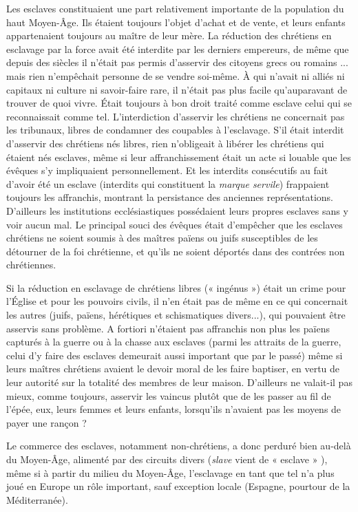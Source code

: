  Les esclaves constituaient une part relativement importante de la population du haut Moyen-Âge. Ils étaient toujours l'objet d'achat et de vente, et leurs enfants appartenaient toujours au maître de leur mère. La réduction des chrétiens en esclavage par la force avait été interdite par les derniers empereurs, de même que depuis des siècles il n'était pas permis d'asservir des citoyens grecs ou romains ... mais rien n'empêchait personne de se vendre soi-même. À qui n'avait ni alliés ni capitaux ni culture ni savoir-faire rare, il n'était pas plus facile qu'auparavant de trouver de quoi vivre. Était toujours à bon droit traité comme esclave celui qui se reconnaissait comme tel. L'interdiction d'asservir les chrétiens ne concernait pas les tribunaux, libres de condamner des coupables à l'esclavage. S'il était interdit d'asservir des chrétiens nés libres, rien n'obligeait à libérer les chrétiens qui étaient nés esclaves, même si leur affranchissement était un acte si louable que les évêques s'y impliquaient personnellement. Et les interdits consécutifs au fait d'avoir été un esclave (interdits qui constituent la \emph{marque servile}) frappaient toujours les affranchis, montrant la persistance des anciennes représentations. D'ailleurs les institutions ecclésiastiques possédaient leurs propres esclaves sans y voir aucun mal. Le principal souci des évêques était d'empêcher que les esclaves chrétiens ne soient soumis à des maîtres païens ou juifs susceptibles de les détourner de la foi chrétienne, et qu'ils ne soient déportés dans des contrées non chrétiennes. 

 Si la réduction en esclavage de chrétiens libres (« ingénus ») était un crime pour l'Église et pour les pouvoirs civils, il n'en était pas de même en ce qui concernait les autres (juifs, païens, hérétiques et schismatiques divers...), qui pouvaient être asservis sans problème. A fortiori n'étaient pas affranchis non plus les païens capturés à la guerre ou à la chasse aux esclaves (parmi les attraits de la guerre, celui d'y faire des esclaves demeurait aussi important que par le passé) même si leurs maîtres chrétiens avaient le devoir moral de les faire baptiser, en vertu de leur autorité sur la totalité des membres de leur maison. D'ailleurs ne valait-il pas mieux, comme toujours, asservir les vaincus plutôt que de les passer au fil de l'épée, eux, leurs femmes et leurs enfants, lorsqu'ils n'avaient pas les moyens de payer une rançon ?

 Le commerce des esclaves, notamment non-chrétiens, a donc perduré bien au-delà du Moyen-Âge, alimenté par des circuits divers (\emph{slave} vient de « esclave » ), même si à partir du milieu du Moyen-Âge, l'esclavage en tant que tel n'a plus joué en Europe un rôle important, sauf exception locale (Espagne, pourtour de la Méditerranée). 

